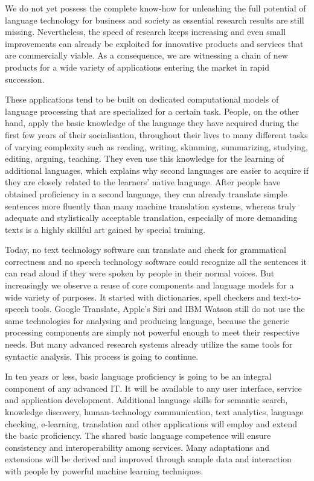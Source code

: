 \documentclass[10pt, plain]{../../metanetpaper}
\begin{document}
\begin{multicols}{2}
We do not yet possess the complete know-how for unleashing the full potential of language technology for business and society as essential research results are still missing. Nevertheless, the speed of research keeps increasing and even small improvements can already be exploited for innovative products and services that are commercially viable. As a consequence, we are witnessing a chain of new products for a wide variety of applications entering the market in rapid succession.

These applications tend to be built on dedicated computational models of language processing that are specialized for a certain task. People, on the other hand, apply the basic knowledge of the language they have acquired during the first few years of their socialisation, throughout their lives to many different tasks of varying complexity such as reading, writing, skimming, summarizing, studying, editing, arguing, teaching. They even use this knowledge for the learning of additional languages, which explains why second languages are easier to acquire if they are closely related to the learners' native language. After people have obtained proficiency in a second language, they can already translate simple sentences more fluently than many machine translation systems, whereas truly adequate and stylistically acceptable translation, especially of more demanding texts is a highly skillful art gained by special training.

Today, no text technology software can translate and check for grammatical correctness and no speech technology software could recognize all the sentences it can read aloud if they were spoken by people in their normal voices. But increasingly we observe a reuse of core components and language models for a wide variety of purposes. It started with dictionaries, spell checkers and text-to-speech tools. Google Translate, Apple's Siri and IBM Watson still do not use the same technologies for analysing and producing language, because the generic processing components are simply not powerful enough to meet their respective needs. But many advanced research systems already utilize the same tools for syntactic analysis. This process is going to continue.

In ten years or less, basic language proficiency is going to be an integral component of any advanced IT. It will be available to any user interface, service and application development. Additional language skills for semantic search, knowledge discovery, human-technology communication, text analytics, language checking, e-learning, translation and other applications will employ and extend the basic proficiency. The shared basic language competence will ensure consistency and interoperability among services. Many adaptations and extensions will be derived and improved through sample data and interaction with people by powerful machine learning techniques.


\end{multicols}
\end{document}
